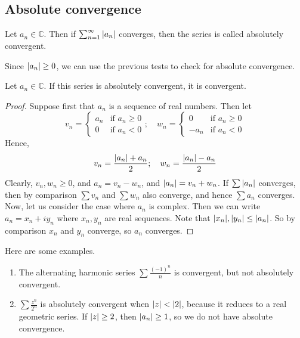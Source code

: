 \subsection{Absolute convergence}
\begin{definition}
	Let \(a_n \in \mathbb C\).
	Then if \(\sum_{n=1}^\infty \abs{a_n}\) converges, then the series is called absolutely convergent.
\end{definition}
\begin{remark}
	Since \(\abs{a_n} \geq 0\), we can use the previous tests to check for absolute convergence.
\end{remark}
\begin{theorem}
	Let \(a_n \in \mathbb C\).
	If this series is absolutely convergent, it is convergent.
\end{theorem}
\begin{proof}
	Suppose first that \(a_n\) is a sequence of real numbers.
	Then let
	\[
		v_n = \begin{cases}
			a_n & \text{if } a_n \geq 0 \\
			0   & \text{if } a_n < 0
		\end{cases};\quad w_n = \begin{cases}
			0    & \text{if } a_n \geq 0 \\
			-a_n & \text{if } a_n < 0
		\end{cases}
	\]
	Hence,
	\[
		v_n = \frac{\abs{a_n} + a_n}{2};\quad w_n = \frac{\abs{a_n} - a_n}{2}
	\]
	Clearly, \(v_n, w_n \geq 0\), and \(a_n = v_n - w_n\), and \(\abs{a_n} = v_n + w_n\).
	If \(\sum \abs{a_n}\) converges, then by comparison \(\sum v_n\) and \(\sum w_n\) also converge, and hence \(\sum a_n\) converges.
	Now, let us consider the case where \(a_n\) is complex.
	Then we can write \(a_n = x_n + iy_n\) where \(x_n, y_n\) are real sequences.
	Note that \(\abs{x_n}, \abs{y_n} \leq \abs{a_n}\).
	So by comparison \(x_n\) and \(y_n\) converge, so \(a_n\) converges.
\end{proof}
\noindent Here are some examples.
\begin{enumerate}
	\item The alternating harmonic series \(\sum \frac{(-1)^n}{n}\) is convergent, but not absolutely convergent.
	\item \(\sum \frac{z^n}{2^n}\) is absolutely convergent when \(\abs{z} < \abs{2}\), because it reduces to a real geometric series.
	      If \(\abs{z} \geq 2\), then \(\abs{a_n} \geq 1\), so we do not have absolute convergence.
\end{enumerate}

